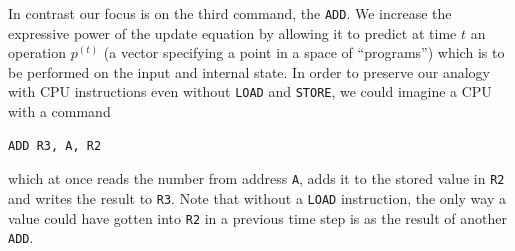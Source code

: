 \documentclass[english,letter paper,12pt,leqno]{article}
\theoremstyle{example}
\newtheorem{remark}[theorem]{Remark}
\numberwithin{equation}{section}
\begin{document}
In contrast our focus is on the third command, the \verb+ADD+. We increase the expressive power of the update equation by allowing it to predict at time $t$ an operation $p^{(t)}$ (a vector specifying a point in a space of ``programs'') which is to be performed on the input and internal state. In order to preserve our analogy with CPU instructions even without \verb+LOAD+ and \verb+STORE+, we could imagine a CPU with a command
\begin{verbatim}
ADD R3, A, R2
\end{verbatim}
which at once reads the number from address \verb+A+, adds it to the stored value in \verb+R2+ and writes the result to \verb+R3+. Note that without a \verb+LOAD+ instruction, the only way a value could have gotten into \verb+R2+ in a previous time step is as the result of another \verb+ADD+.


\end{document}
